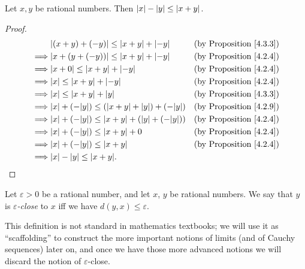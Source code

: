 \begin{additional corollary}\label{ac 4.3.1}
Let \(x, y\) be rational numbers.
Then \(\abs*{x} - \abs*{y} \leq \abs*{x + y}\).
\end{additional corollary}

\begin{proof}
    \begin{align*}
                 & \abs*{(x + y) + (-y)} \leq \abs*{x + y} + \abs*{-y}                 & \text{(by Proposition \ref{4.3.3})} \\
        \implies & \abs*{x + (y + (-y))} \leq \abs*{x + y} + \abs*{-y}                 & \text{(by Proposition \ref{4.2.4})} \\
        \implies & \abs*{x + 0} \leq \abs*{x + y} + \abs*{-y}                          & \text{(by Proposition \ref{4.2.4})} \\
        \implies & \abs*{x} \leq \abs*{x + y} + \abs*{-y}                              & \text{(by Proposition \ref{4.2.4})} \\
        \implies & \abs*{x} \leq \abs*{x + y} + \abs*{y}                               & \text{(by Proposition \ref{4.3.3})} \\
        \implies & \abs*{x} + (-\abs*{y}) \leq (\abs*{x + y} + \abs*{y}) + (-\abs*{y}) & \text{(by Proposition \ref{4.2.9})} \\
        \implies & \abs*{x} + (-\abs*{y}) \leq \abs*{x + y} + (\abs*{y} + (-\abs*{y})) & \text{(by Proposition \ref{4.2.4})} \\
        \implies & \abs*{x} + (-\abs*{y}) \leq \abs*{x + y} + 0                        & \text{(by Proposition \ref{4.2.4})} \\
        \implies & \abs*{x} + (-\abs*{y}) \leq \abs*{x + y}                            & \text{(by Proposition \ref{4.2.4})} \\
        \implies & \abs*{x} - \abs*{y} \leq \abs*{x + y}.
    \end{align*}
\end{proof}

\begin{definition}\label{4.3.4}
    Let \(\varepsilon > 0\) be a rational number, and let \(x\), \(y\) be rational numbers.
    We say that \(y\) is \emph{\(\varepsilon\)-close} to \(x\) iff we have \(d(y, x) \leq \varepsilon\).
\end{definition}

\begin{remark}\label{4.3.5}
    This definition is not standard in mathematics textbooks;
    we will use it as ``scaffolding'' to construct the more important notions of limits (and of Cauchy sequences) later on, and once we have those more advanced notions we will discard the notion of \(\varepsilon\)-close.
\end{remark}

